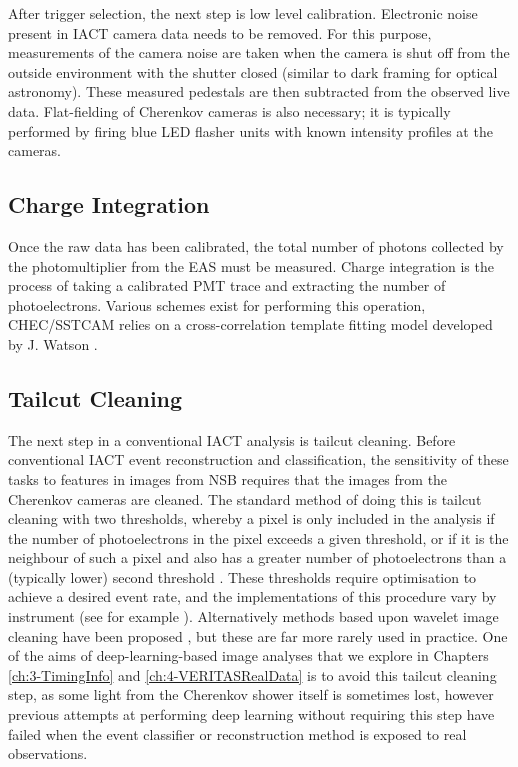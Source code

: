 After trigger selection, the next step is low level calibration. Electronic noise present in IACT camera data needs to be removed. For this purpose, measurements of the camera noise are taken when the camera is shut off from the outside environment with the shutter closed (similar to dark framing for optical astronomy). These measured pedestals are then subtracted from the observed live data. Flat-fielding of Cherenkov cameras is also necessary; it is typically performed by firing blue LED flasher units with known intensity profiles at the cameras.

\subsection{Charge Integration}

Once the raw data has been calibrated, the total number of photons collected by the photomultiplier from the EAS must be measured. Charge integration is the process of taking a calibrated PMT trace and extracting the number of photoelectrons. Various schemes exist for performing this operation, CHEC/SSTCAM relies on a cross-correlation template fitting model developed by J. Watson \cite{jasonthesis}.

\subsection{Tailcut Cleaning}

The next step in a conventional IACT analysis is tailcut cleaning. Before conventional IACT event reconstruction and classification, the sensitivity of these tasks to features in images from NSB requires that the images from the Cherenkov cameras are cleaned. The standard method of doing this is tailcut cleaning with two thresholds, whereby a pixel is only included in the analysis if the number of photoelectrons in the pixel exceeds a given threshold, or if it is the neighbour of such a pixel and also has a greater number of photoelectrons than a (typically lower) second threshold \cite{hegratailcut}. These thresholds require optimisation to achieve a desired event rate, and the implementations of this procedure vary by instrument (see for example \cite{Benbow} \cite{magictailcut} \cite{magictime}). Alternatively methods based upon wavelet image cleaning have been proposed \cite{wavelet}, but these are far more rarely used in practice. One of the aims of deep-learning-based image analyses that we explore in Chapters \ref{ch:3-TimingInfo} and \ref{ch:4-VERITASRealData} is to avoid this tailcut cleaning step, as some light from the Cherenkov shower itself is sometimes lost, however previous attempts at performing deep learning without requiring this step have failed when the event classifier or reconstruction method is exposed to real observations. 

